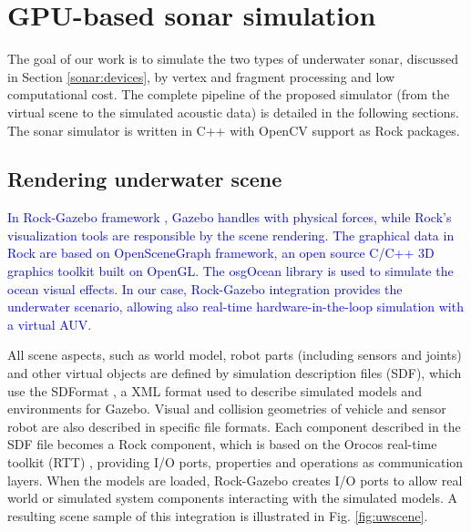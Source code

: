 \documentclass[final,5p,times]{elsarticle}
\begin{document}

\section{GPU-based sonar simulation}
\label{dev}

The goal of our work is to simulate the two types of underwater sonar, discussed in Section \ref{sonar:devices}, by vertex and fragment processing and low computational cost. The complete pipeline of the proposed simulator (from the virtual scene to the simulated acoustic data) is detailed in the following sections. The sonar simulator is written in C++ with OpenCV \cite{bradski2000} support as Rock packages.


\subsection{Rendering underwater scene}
\label{dev:uwscene}

\textcolor{blue}{In Rock-Gazebo framework \cite{watanabe2015}, Gazebo handles with physical forces, while Rock's visualization tools are responsible by the scene rendering. The graphical data in Rock are based on OpenSceneGraph framework, an open source C/C++ 3D graphics toolkit built on OpenGL. The osgOcean library is used to simulate the ocean visual effects. In our case, Rock-Gazebo integration provides the underwater scenario, allowing also real-time hardware-in-the-loop simulation with a virtual AUV.}

All scene aspects, such as world model, robot parts (including sensors and
joints) and other virtual objects are defined by simulation description files (SDF), which use the SDFormat \cite{sdformat2017}, a XML format used to describe simulated models and environments for Gazebo. Visual and collision geometries of vehicle and sensor robot are also described in specific file formats. Each component described in the SDF file becomes a Rock component, which is based on the Orocos real-time toolkit (RTT) \cite{soetens2005}, providing I/O ports, properties and operations as communication layers. When the models are loaded, Rock-Gazebo creates I/O ports to allow real world or simulated system components interacting with the simulated models. A resulting scene sample of this integration is illustrated in Fig. \ref{fig:uwscene}.
\end{document}

